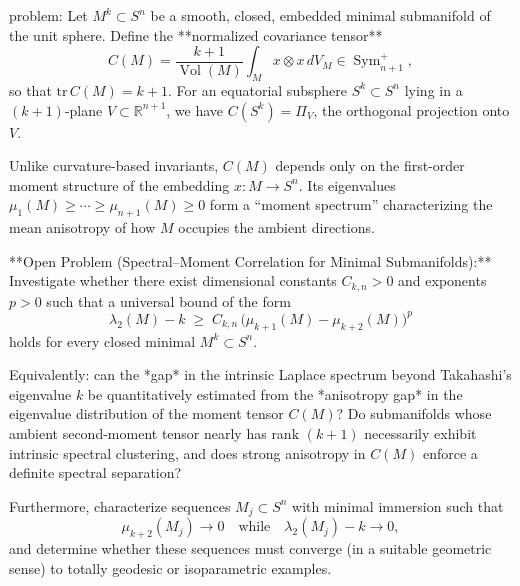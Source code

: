 problem:  
Let \(M^k \subset S^n\) be a smooth, closed, embedded minimal submanifold of the unit sphere.  
Define the **normalized covariance tensor**
\[
C(M) = \frac{k+1}{\operatorname{Vol}(M)} \int_M x \otimes x\, dV_M \in \operatorname{Sym}_{n+1}^+,
\]
so that \(\mathrm{tr}\,C(M)=k+1\). For an equatorial subsphere \(S^k \subset S^n\) lying in a \((k+1)\)-plane \(V \subset \mathbb{R}^{n+1}\), we have \(C(S^k)=\Pi_V\), the orthogonal projection onto \(V\).

Unlike curvature-based invariants, \(C(M)\) depends only on the first-order moment structure of the embedding \(x:M \to S^n\).  
Its eigenvalues \(\mu_1(M)\ge\cdots\ge\mu_{n+1}(M)\ge 0\) form a “moment spectrum” characterizing the mean anisotropy of how \(M\) occupies the ambient directions.

**Open Problem (Spectral–Moment Correlation for Minimal Submanifolds):**  
Investigate whether there exist dimensional constants \(C_{k,n}>0\) and exponents \(p>0\) such that a universal bound of the form
\[
\lambda_2(M) - k \;\ge\; C_{k,n}\, \big(\mu_{k+1}(M) - \mu_{k+2}(M)\big)^p
\]
holds for every closed minimal \(M^k \subset S^n\).  

Equivalently: can the *gap* in the intrinsic Laplace spectrum beyond Takahashi’s eigenvalue \(k\) be quantitatively estimated from the *anisotropy gap* in the eigenvalue distribution of the moment tensor \(C(M)\)?  
Do submanifolds whose ambient second-moment tensor nearly has rank \((k+1)\) necessarily exhibit intrinsic spectral clustering, and does strong anisotropy in \(C(M)\) enforce a definite spectral separation?

Furthermore, characterize sequences \(M_j\subset S^n\) with minimal immersion such that
\[
\mu_{k+2}(M_j) \to 0 \quad\text{while}\quad \lambda_2(M_j)-k\to 0,
\]
and determine whether these sequences must converge (in a suitable geometric sense) to totally geodesic or isoparametric examples.


